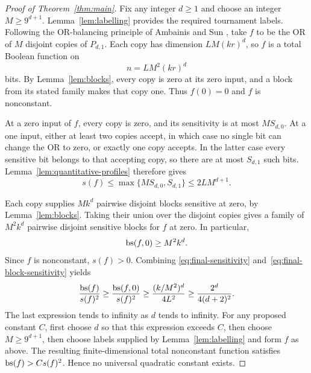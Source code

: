 \begin{proof}[Proof of Theorem~\ref{thm:main}]
Fix any integer $d\geq1$ and choose an integer $M\geq9^{d+1}$.
Lemma~\ref{lem:labelling} provides the required tournament labels.
Following the OR-balancing principle of Ambainis and Sun
\cite[Section~4, Lemma~1]{AmbainisSun2011}, take $f$ to be the OR of $M$
disjoint copies of $P_{d,1}$.
Each copy has dimension $LM(kr)^d$, so $f$ is a total Boolean function on
\begin{equation}
\label{eq:final-dimension}
 n=LM^2(kr)^d
\end{equation}
bits. By Lemma~\ref{lem:blocks}, every copy is zero at its zero input,
and a block from its stated family makes that copy one.
Thus $f(0)=0$ and $f$ is nonconstant.

At a zero input of $f$, every copy is zero, and its sensitivity is at most
$M S_{d,0}$. At a one input, either at least two copies accept, in which
case no single bit can change the OR to zero, or exactly one copy accepts.
In the latter case every sensitive bit belongs to that accepting copy,
so there are at most $S_{d,1}$ such bits.
Lemma~\ref{lem:quantitative-profiles} therefore gives
\begin{equation}
\label{eq:final-sensitivity}
 s(f)\leq\max\{M S_{d,0},S_{d,1}\}
       \leq2L M^{d+1}.
\end{equation}

Each copy supplies $M k^d$ pairwise disjoint blocks sensitive at zero,
by Lemma~\ref{lem:blocks}. Taking their union over the disjoint copies
gives a family of $M^2k^d$ pairwise disjoint sensitive blocks for $f$ at zero.
In particular,
\begin{equation}
\label{eq:final-block-sensitivity}
 \operatorname{bs}(f,0)\geq M^2k^d.
\end{equation}
Since $f$ is nonconstant, $s(f)>0$. Combining
\eqref{eq:final-sensitivity} and~\eqref{eq:final-block-sensitivity} yields
\begin{equation}
\label{eq:ratio-separation}
 \frac{\operatorname{bs}(f)}{s(f)^2}
 \geq\frac{\operatorname{bs}(f,0)}{s(f)^2}
 \geq\frac{(k/M^2)^d}{4L^2}
 \geq\frac{2^d}{4(d+2)^2}.
\end{equation}
The last expression tends to infinity as $d$ tends to infinity.
For any proposed constant $C$, first choose $d$ so that this expression
exceeds $C$, then choose $M\geq9^{d+1}$, then choose labels supplied by
Lemma~\ref{lem:labelling} and form $f$ as above.
The resulting finite-dimensional total nonconstant function satisfies
$\operatorname{bs}(f)>C s(f)^2$. Hence no universal quadratic constant exists.
\end{proof}

